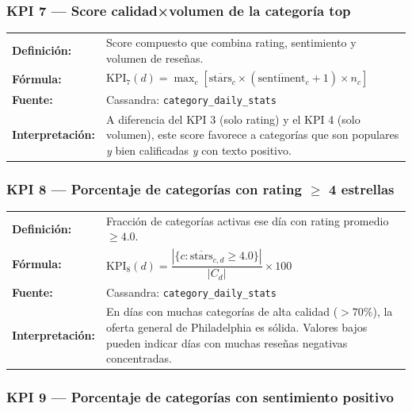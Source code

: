 \documentclass[12pt,a4paper]{article}
\begin{document}
\vspace{0.5em}

\subsubsection{KPI 7 — Score calidad×volumen de la categoría top}

\begin{tabular}{>{\bfseries}l >{\raggedright\arraybackslash}p{10.5cm}}
\textbf{Definición:} & Score compuesto que combina rating, sentimiento y volumen de reseñas. \\
\textbf{Fórmula:} & $\text{KPI}_7(d) = \max_c \left[ \overline{\text{stars}}_c \times (\overline{\text{sentiment}}_c + 1) \times n_c \right]$ \\
\textbf{Fuente:} & Cassandra: \texttt{category\_daily\_stats} \\
\textbf{Interpretación:} & A diferencia del KPI 3 (solo rating) y el KPI 4 (solo volumen), este score favorece a categorías que son populares \textit{y} bien calificadas \textit{y} con texto positivo. \\
\end{tabular}

\vspace{0.5em}

\subsubsection{KPI 8 — Porcentaje de categorías con rating $\geq$ 4 estrellas}

\begin{tabular}{>{\bfseries}l >{\raggedright\arraybackslash}p{10.5cm}}
\textbf{Definición:} & Fracción de categorías activas ese día con rating promedio $\geq 4.0$. \\
\textbf{Fórmula:} & $\text{KPI}_8(d) = \dfrac{|\{c : \overline{\text{stars}}_{c,d} \geq 4.0\}|}{|C_d|} \times 100$ \\
\textbf{Fuente:} & Cassandra: \texttt{category\_daily\_stats} \\
\textbf{Interpretación:} & En días con muchas categorías de alta calidad ($> 70\%$), la oferta general de Philadelphia es sólida. Valores bajos pueden indicar días con muchas reseñas negativas concentradas. \\
\end{tabular}

\vspace{0.5em}

\subsubsection{KPI 9 — Porcentaje de categorías con sentimiento positivo}
\end{document}
